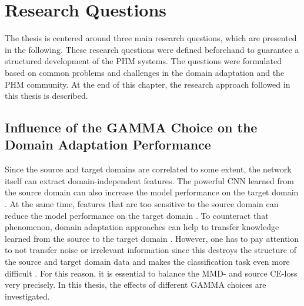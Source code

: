 \chapter{Research Questions}\label{chapter:research_approach}
The thesis is centered around three main research questions, which are presented in the following. These research questions were defined beforehand to guarantee a structured development of the PHM systems. The questions were formulated based on common problems and challenges in the domain adaptation and the PHM community. At the end of this chapter, the research approach followed in this thesis is described.

\section{Influence of the GAMMA Choice on the Domain Adaptation Performance}
Since the source and target domains are correlated to some extent, the network itself can extract domain-independent features. The powerful CNN learned from the source domain can also increase the model performance on the target domain \cite{li2020}. At the same time, features that are too sensitive to the source domain can reduce the model performance on the target domain \cite{li2020}. To counteract that phenomenon, domain adaptation approaches can help to transfer knowledge learned from the source to the target domain \cite{li2020}. However, one has to pay attention to not transfer noise or irrelevant information since this destroys the structure of the source and target domain data and makes the classification task even more difficult \cite{li2020}. For this reason, it is essential to balance the MMD- and source CE-loss very precisely. In this thesis, the effects of different GAMMA choices are investigated.

